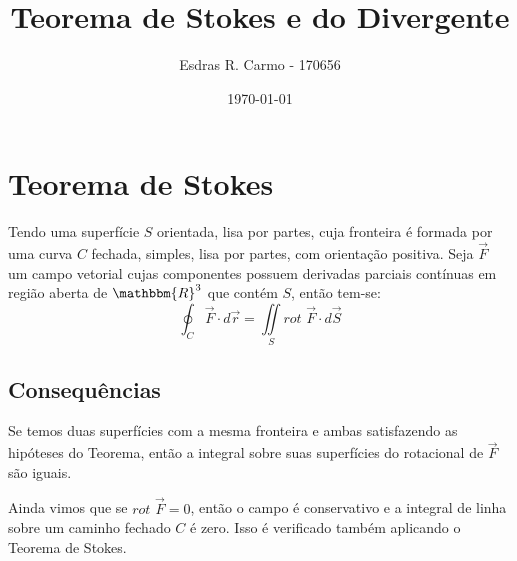 \documentclass{article}
\author{Esdras R. Carmo - 170656}
\title{Teorema de Stokes e do Divergente}
\date{\today}
\newcommand{\REAL}{\mathbbm{R}}
\newcommand{\doubleint}[2] {\iint\limits_{#1} #2}
\newcommand{\Rot}[0] {\textit{rot }}
\begin{document}
    \maketitle

    \section{Teorema de Stokes}
        Tendo uma superfície $S$ orientada, lisa por partes, cuja fronteira é formada por uma curva $C$
        fechada, simples, lisa por partes, com orientação positiva. Seja $\vec{F}$ um campo vetorial
        cujas componentes possuem derivadas parciais contínuas em região aberta de $\REAL^3$ que contém
        $S$, então tem-se:
        \[
            \oint_C \vec{F} \cdot d\vec{r} = \doubleint{S}{\Rot \vec{F} \cdot d\vec{S}}
        \]

        \subsection{Consequências}
            Se temos duas superfícies com a mesma fronteira e ambas satisfazendo as hipóteses do Teorema,
            então a integral sobre suas superfícies do rotacional de $\vec{F}$ são iguais.

            Ainda vimos que se $\Rot \vec{F} = 0$, então o campo é conservativo e a integral de linha
            sobre um caminho fechado $C$ é zero. Isso é verificado também aplicando o Teorema de Stokes.
\end{document}
